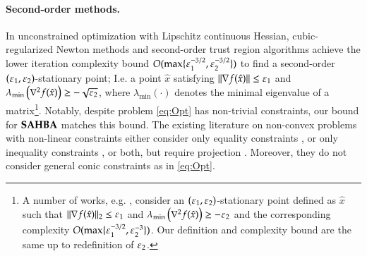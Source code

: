 \paragraph{Second-order methods.}
In unconstrained optimization with Lipschitz continuous Hessian, cubic-regularized Newton methods \cite{Gri81,NesPol06} and second-order trust region algorithms \cite{conn2000trust,CarGouToi12,CurRobSam17} achieve the lower iteration complexity bound $O(\max\{\varepsilon_1^{-3/2},\varepsilon_2^{-3/2}\})$ \cite{CarDucHinSid19b,CarDucHinSid19} to find  a second-order $(\varepsilon_1,\varepsilon_2)$-stationary point; I.e. a point $\hat{x}$ satisfying $\lVert\nabla f(\hat{x})\rVert\leq \varepsilon_1$ and $\lambda_{\min} \left(\nabla^2 f(\hat{x})\right) \geq - \sqrt{\varepsilon_2}$, where $\lambda_{\min}(\cdot)$ denotes the minimal eigenvalue of a matrix\footnote{A number of works, e.g. \cite{CarGouToi12,NeiWr20}, consider an $(\varepsilon_1,\varepsilon_2)$-stationary point defined as $\hat{x}$ such that $\|\nabla f(\hat{x}) \|_2 \leq \varepsilon_1$ and $\lambda_{\min} \left(\nabla^2 f(\hat{x})\right) \geq - \varepsilon_2$ and the corresponding complexity $O(\max\{\varepsilon_1^{-3/2},\varepsilon_2^{-3}\})$. Our definition and complexity bound are the same up to redefinition of $\varepsilon_2$.}. 
Notably, despite problem \eqref{eq:Opt} has non-trivial constraints, our bound for $\operatorname{\mathbf{SAHBA}}$ matches this bound.
The existing literature on non-convex problems with non-linear constraints either consider only equality constraints \cite{curtis2018complexity}, or only inequality constraints \cite{hinder2018worst-case}, or both, but require projection \cite{cartis2019optimality}. Moreover, they do not consider general conic constraints as in \eqref{eq:Opt}.
